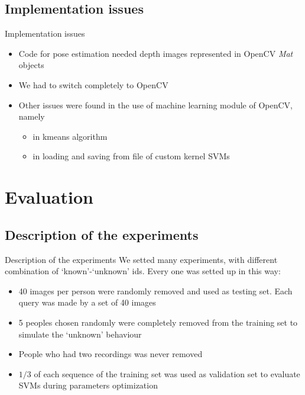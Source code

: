 \documentclass[unknownkeysallowed]{beamer}
\begin{document}
\subsection{Implementation issues}
\begin{frame}{Implementation issues}
	\begin{itemize}
		\item Code for pose estimation needed depth images represented
			in OpenCV \textit{Mat} objects
		\item We had to switch completely to OpenCV
		\item Other issues were found in the use of machine learning
			module of OpenCV, namely
			\begin{itemize}
				\item in kmeans algorithm
				\item in loading and saving from file of custom
					kernel SVMs
			\end{itemize}
	\end{itemize}
\end{frame}

\section{Evaluation}
\subsection{Description of the experiments}
\begin{frame}{Description of the experiments}
	We setted many experiments, with different combination of
	`known'-`unknown' ids. Every one was setted up in this way:
	\begin{itemize}
		\item 40 images per person were randomly removed and used as
			testing set. Each query was made by a set of 40 images
		\item 5 peoples chosen randomly were completely removed from
			the training set to simulate the `unknown' behaviour
		\item People who had two recordings was never removed
		\item $1/3$ of each sequence of the training set was used as
			validation set to evaluate SVMs during parameters
			optimization
	\end{itemize}
\end{frame}
\end{document}
